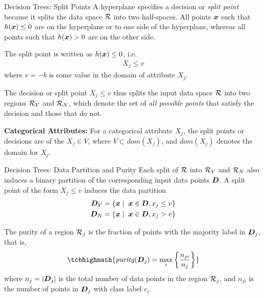 \begin{frame}{Decision Trees: Split Points} 
A hyperplane specif\/{i}es a decision or {\em
split point} because it splits the data space ${\mathcal R}$ into two
half-spaces. All points ${\boldsymbol x}$ such that $h({\boldsymbol x}) \le 0$ are on the
hyperplane or to one side of the hyperplane, whereas all points
such that $h({\boldsymbol x}) > 0$ are on the other side. 

\medskip
The split point is written as $h({\boldsymbol x}) \le 0$, i.e.
\begin{align*}
  X_{j} \le v
\end{align*}
where $v = -b$ is some value in the domain of attribute $X_{j}$. 

\medskip
The
decision or split point $X_{j} \le v$ thus splits the input data
space ${\mathcal R}$ into two regions ${\mathcal R}_Y$ and ${\mathcal R}_N$, which denote the
set of {\em all possible points} that satisfy the decision and
those that do not.

\bigskip
{\bf Categorical Attributes:}
 For a categorical attribute $X_{j}$, the split points or
decisions are of the $X_{j} \in V$, where $V \subset dom(X_{j})$, and
$dom(X_{j})$ denotes the domain for $X_{j}$. 

\end{frame}



\begin{frame}{Decision Trees: Data Partition and Purity}
Each split of ${\mathcal R}$ into
${\mathcal R}_Y$ and ${\mathcal R}_N$ also induces a binary partition of the
corresponding input data points ${\boldsymbol D}$. A split point of
the form $X_{j} \le v$ induces the data partition
\begin{align*}
  {\boldsymbol D}_Y & = \{{\boldsymbol x} \mid \; {\boldsymbol x} \in {\boldsymbol D}, x_{j} \le v\}\\
  {\boldsymbol D}_N & = \{{\boldsymbol x} \mid \; {\boldsymbol x} \in {\boldsymbol D}, x_{j} > v\}
\end{align*}

\bigskip
The purity of a region ${\mathcal R}_{j}$ is the
fraction of points with the majority label in ${\boldsymbol D}_{j}$, that is,
\begin{align*}
\tcbhighmath{
  \mathit{purity}(\bD_{j}) = \max_i \lB\{ {n_{ji} \over n_{j}} \rB \}
}
\end{align*}
where $n_{j}=|{\boldsymbol D}_{j}|$ is the total number of data points in the
region ${\mathcal R}_{j}$, and $n_{ji}$ is the number of points in ${\boldsymbol D}_{j}$
with class label $c_i$.
\end{frame}





